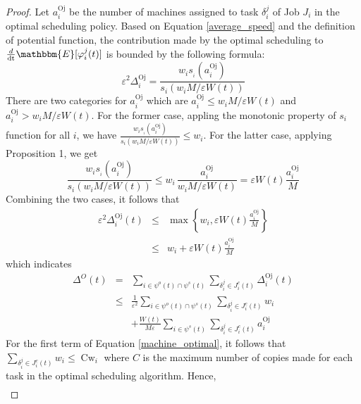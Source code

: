 \documentclass[10pt,conference,compsocconf,letterpaper]{IEEEtran}
\newcommand{\tmop}[1]{\ensuremath{\operatorname{#1}}}
\begin{document}
\begin{proof}
Let $a_i^{\tmop{Oj}}$ be the number of machines assigned to task $\delta_i^j$
of Job $J_i$ in the optimal scheduling policy. Based on Equation \eqref{average_speed} and the definition of
 potential function, the contribution made by the
optimal scheduling to $\frac{d}{\tmop{dt}} \mathbbm{E} [\varphi_i^j (t)]$ is
bounded by the following formula:
\begin{equation}
  \varepsilon^2 \Delta_i^{\tmop{Oj}} = \frac{w_i s_{_i} (a_i^{\tmop{Oj}})}{s_i
  (w_i M / \varepsilon W (t))}
\end{equation}
There are two categories for $a_{i^{}}^{\tmop{Oj}}$ which are
$a_{i^{}}^{\tmop{Oj}} \leqslant w_i M / \varepsilon W (t)$ and
$a_{i^{}}^{\tmop{Oj}} > w_i M / \varepsilon W (t)$. For the former case,
appling the monotonic property of $s_i$ function for all $i$, we have
$\frac{w_i s_{_i} (a_i^{\tmop{Oj}})}{s_i (w_i M / \varepsilon W (t))}
\leqslant w_i$. For the latter case, applying Proposition 1, we get
\begin{equation}
  \frac{w_i s_{_i} (a_i^{\tmop{Oj}})}{s_i (w_i M / \varepsilon W (t))}
  \leqslant w_i \frac{}{} \frac{a_i^{\tmop{Oj}}}{w_i M / \varepsilon W (t)} =
  \varepsilon W (t) \frac{a_i^{\tmop{Oj}}}{M}
\end{equation}
Combining the two cases, it follows that
\begin{eqnarray}
  \varepsilon^2 \Delta_i^{\tmop{Oj}} (t) & \leqslant & \max \left\{ w_i,
  \varepsilon W (t) \frac{a_i^{\tmop{Oj}}}{M} \right\} \\
   & \leqslant & w_i + \varepsilon W (t) \frac{a_i^{\tmop{Oj}}}{M}
\end{eqnarray}
which indicates
\begin{eqnarray}
  \Delta_{}^O (t) & = & \sum_{i \text{} \in \psi^o (t) \cap \psi^s (t)}
  \sum_{\delta^j_i \in J_i^c (t)} \Delta_i^{\tmop{Oj}} (t) \\
   \label{machine_optimal}
  & \leqslant & \frac{1}{\varepsilon^2} \sum_{i \text{} \in \psi^o (t) \cap
  \psi^s (t)} \sum_{\delta^j_i \in J_i^c (t)} w_i \nonumber\\
  &  & + \frac{W (t)}{M \varepsilon^{}} \sum_{i \text{} \in \psi^s (t)}
  \sum_{\delta^j_i \in J_i^c (t)} a_i^{\tmop{Oj}}
\end{eqnarray}
For the first term of Equation \eqref{machine_optimal}, it follows that $\sum_{\delta^j_i \in
J_i^c (t)} w_i \leqslant \tmop{C w}_i$ where $C$ is the maximum number of copies made for each task in the
optimal scheduling algorithm. Hence,
\begin{eqnarray}
\label{optimal_dynamic}

\end{eqnarray}
\end{proof}
\end{document}
